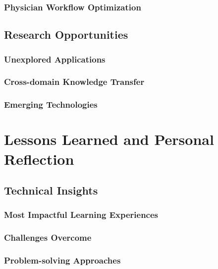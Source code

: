 \documentclass[12pt,a4paper]{report}
\begin{document}
\subsection{Physician Workflow Optimization}

\section{Research Opportunities}

\subsection{Unexplored Applications}

\subsection{Cross-domain Knowledge Transfer}

\subsection{Emerging Technologies}

\chapter{Lessons Learned and Personal Reflection}

\section{Technical Insights}

\subsection{Most Impactful Learning Experiences}

\subsection{Challenges Overcome}

\subsection{Problem-solving Approaches}
\end{document}
